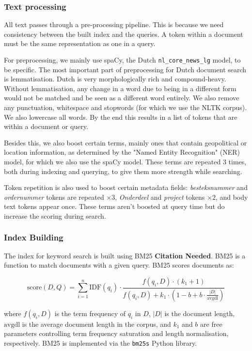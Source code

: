\subsubsection{Text processing}

All text passes through a pre-processing pipeline. This is because we need consistency between the built index and the queries. A token within a document must be the same representation as one in a query. 

For preprocessing, we mainly use spaCy, the Dutch \texttt{nl\_core\_news\_lg} model, to be specific. The most important part of preprocessing for Dutch document search is lemmatisation. Dutch is very morphologically rich and compound-heavy. Without lemmatisation, any change in a word due to being in a different form would not be matched and be seen as a different word entirely. We also remove any punctuation, whitespace and stopwords (for which we use the NLTK corpus). We also lowercase all words. By the end this results in a list of tokens that are within a document or query.

Besides this, we also boost certain terms, mainly ones that contain geopolitical or location information, as determined by the "Named Entity Recognition" (NER) model, for which we also use the spaCy model. These terms are repeated 3 times, both during indexing and querying, to give them more strength while searching.

Token repetition is also used to boost certain metadata fields: \textit{besteksnummer} and \textit{ordernummer} tokens are repeated $\times 3$, \textit{Onderdeel} and \textit{project} tokens $\times 2$, and body text tokens appear once. These terms aren't boosted at query time but do increase the scoring during search.

\subsubsection{Index Building}

The index for keyword search is built using BM25 \textbf{Citation Needed}. BM25 is a function to match documents with a given query. BM25 scores documents as:

\begin{equation}
    \text{score}(D, Q) = \sum_{i=1}^{n} \text{IDF}(q_i) \cdot \frac{f(q_i, D) \cdot (k_1 + 1)}{f(q_i, D) + k_1 \cdot \left(1 - b + b \cdot \frac{|D|}{\text{avgdl}}\right)}
\end{equation}

\noindent where $f(q_i, D)$ is the term frequency of $q_i$ in $D$, $|D|$ is the document length, $\text{avgdl}$ is the average document length in the corpus, and $k_1$ and $b$ are free parameters controlling term frequency saturation and length normalisation, respectively. BM25 is implemented via the \texttt{bm25s} Python library.

